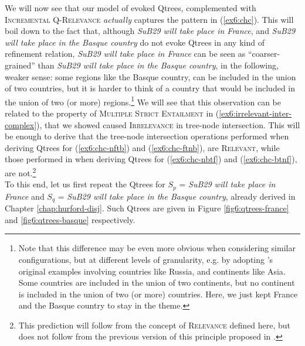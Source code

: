 We will now see that our model of evoked Qtrees, complemented with \textsc{Incremental Q-Relevance} \textit{actually} captures the pattern in (\ref{ex6:chc}). This will boil down to the fact that, although \textit{SuB29 will take place in France}, and \textit{SuB29 will take place in the Basque country} do not evoke Qtrees in any kind of refinement relation, \textit{SuB29 will take place in France} can be seen as ``coarser-grained'' than \textit{SuB29 will take place in the Basque country}, in the following, weaker sense: some regions like the Basque country, can be included in the union of two countries, but it is harder to think of a country that would be included in the union of two (or more) regions.\footnote{Note that this difference may be even more obvious when considering similar configurations, but at different levels of granularity, e.g. by adopting \citeauthor{Singh2008a}'s original examples involving countries like Russia, and continents like Asia. Some countries are included in the union of two continents, but no continent is included in the union of two (or more) countries. Here, we just kept France and the Basque country to stay in the theme.} We will see that this observation can be related to the property of \textsc{Multiple Strict Entailment} in (\ref{ex6:irrelevant-inter-complex}), that we showed caused \textsc{Irrelevance} in tree-node intersection. This will be enough to derive that the tree-node intersection operations performed when deriving Qtrees for (\ref{ex6:chc-nftb}) and (\ref{ex6:chc-ftnb}), are \textsc{Relevant}, while those performed in when deriving Qtrees for (\ref{ex6:chc-nbtf}) and (\ref{ex6:chc-btnf}), are not.\footnote{This prediction will follow from the concept of \textsc{Relevance} defined here, but does not follow from the previous version of this principle proposed in \textcite{HenotMortier2024a}.}\\

To this end, let us first repeat the Qtrees for $S_p$ = \textit{SuB29 will take place in France} and $S_q$ = \textit{SuB29 will take place in the Basque country}, already derived in Chapter \ref{chap:hurford-disj}. Such Qtrees are given in Figure \ref{fig6:qtrees-france} and \ref{fig6:qtrees-basque}  respectively.



